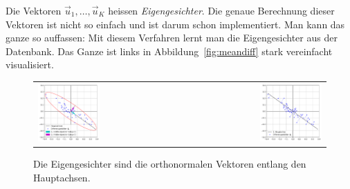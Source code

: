 Die Vektoren $\vec u_1,\ldots,\vec u_K$ heissen \textit{Eigengesichter}.
Die genaue Berechnung dieser Vektoren ist nicht so einfach und ist darum schon implementiert.
Man kann das ganze so auffassen: Mit diesem Verfahren \glqq{}lernt\grqq{} man die Eigengesichter aus der Datenbank.
Das Ganze ist links in Abbildung~\ref{fig:meandiff} stark vereinfacht visualisiert.
\begin{figure}[ht]
	\centering
	\begin{tabular}{lr}
		\includegraphics[width=0.45\textwidth]{images/facespace/principal_components} & \includegraphics[width=0.45\textwidth]{images/facespace/distance_complicated} \\
	\end{tabular}
	\caption{Die Eigengesichter sind die orthonormalen Vektoren entlang den Hauptachsen.}
	\label{fig:construction}
\end{figure}

